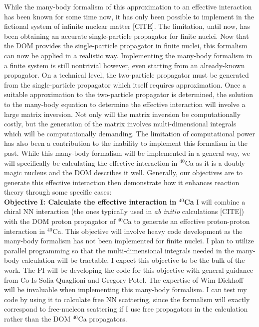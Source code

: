 \documentclass[12pt]{article}
\begin{document}
While the many-body formalism of this approximation to an effective interaction has been known for some time now, it has only been possible to implement in the fictional system of
infinite nuclear matter [CITE]. The limitation, until now, has been obtaining an accurate single-particle propagator for finite nuclei. Now that the DOM provides the
single-particle propagator in finite nuclei, this formalism can now be applied in a realistic way. Implementing the many-body formalism in a finite system is still nontrivial
however, even starting from an already-known propagator. On a technical level, the two-particle propagator must be generated from the single-particle propagator which itself
requires approximation. Once a suitable approximation to the two-particle propagator is determined, the solution to the many-body equation to determine the effective interaction
will involve a large matrix inversion. Not only will the matrix inversion be computationally costly, but the generation of the matrix involves multi-dimensional integrals which
will be computationally demanding. The limitation of computational power has also been a contribution to the inability to implement this formalism in the past. While this many-body
formalism will be implemented in a general way, we will specifically be calculating the effective interaction in $^{40}$Ca as it is a doubly-magic nucleus and the DOM describes it
well. Generally, our objectives are to generate this effective interaction then demonstrate how it enhances reaction theory through some specific cases:
\\
\textbf{Objective I: Calculate the effective interaction in $^{40}$Ca}
I will combine a chiral NN interaction (the ones typically used in \textit{ab initio} calculations [CITE]) with the DOM proton propagator of $^{40}$Ca to generate an effective
proton-proton interaction in $^{40}$Ca. This objective will involve heavy code development as the many-body formalism has not been implemented for finite nuclei. I plan to utilize
parallel programming so that the multi-dimensional integrals needed in the many-body calculation will be tractable. I expect this objective to be the bulk of the work. The PI will
be developing the code for this objective with general guidance from Co-Is Sofia Quaglioni and Gregory Potel. The expertise of Wim Dickhoff will be invaluable when implementing
this many-body formalism. I can test my code by using it to calculate free NN scattering, since the formalism will exactly correspond to free-nucleon scattering if I use free
propagators in the calculation rather than the DOM $^{40}$Ca propagators.
\end{document}
